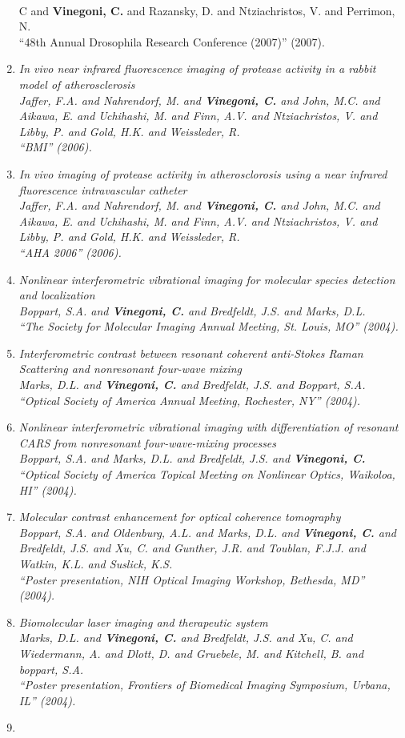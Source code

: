 \documentclass{resume}
\begin{document}
\begin{category}{~~}
\begin{enumerate}
C and {\bf Vinegoni, C.} and Razansky, D. and Ntziachristos, V. and Perrimon, N. \\ ``48th Annual Drosophila Research Conference (2007)''  (2007). \item \it In vivo near infrared fluorescence imaging of protease activity in a rabbit model of atherosclerosis \\ Jaffer, F.A. and Nahrendorf, M. and {\bf Vinegoni, C.} and John, M.C. and Aikawa, E. and Uchihashi, M. and Finn, A.V. and Ntziachristos, V. and Libby, P. and Gold, H.K. and Weissleder, R. \\ ``BMI''  (2006). \item \it In vivo imaging of protease activity in atherosclorosis using a near infrared fluorescence intravascular catheter \\ Jaffer, F.A. and Nahrendorf, M. and {\bf Vinegoni, C.} and John, M.C. and Aikawa, E. and Uchihashi, M. and Finn, A.V. and Ntziachristos, V. and Libby, P. and Gold, H.K. and Weissleder, R. \\ ``AHA 2006''  (2006). \item \it Nonlinear interferometric vibrational imaging for molecular species detection and localization \\ Boppart, S.A. and {\bf Vinegoni, C.} and Bredfeldt, J.S. and Marks, D.L. \\ ``The Society for Molecular Imaging Annual Meeting, St. Louis, MO''  (2004). \item \it Interferometric contrast between resonant coherent anti-Stokes Raman Scattering and nonresonant four-wave mixing \\ Marks, D.L. and {\bf Vinegoni, C.} and Bredfeldt, J.S. and Boppart, S.A. \\ ``Optical Society of America Annual Meeting, Rochester, NY''  (2004). \item \it Nonlinear interferometric vibrational imaging with differentiation of resonant CARS from nonresonant four-wave-mixing processes \\ Boppart, S.A. and Marks, D.L. and Bredfeldt, J.S. and {\bf Vinegoni, C.} \\ ``Optical Society of America Topical Meeting on Nonlinear Optics, Waikoloa, HI''  (2004). \item \it Molecular contrast enhancement for optical coherence tomography \\ Boppart, S.A. and Oldenburg, A.L. and Marks, D.L. and {\bf Vinegoni, C.} and Bredfeldt, J.S. and Xu, C. and Gunther, J.R. and Toublan, F.J.J. and Watkin, K.L. and Suslick, K.S. \\ ``Poster presentation, NIH Optical Imaging Workshop, Bethesda, MD''  (2004). \item \it Biomolecular laser imaging and therapeutic system \\ Marks, D.L. and {\bf Vinegoni, C.} and Bredfeldt, J.S. and Xu, C. and Wiedermann, A. and Dlott, D. and Gruebele, M. and Kitchell, B. and boppart, S.A. \\ ``Poster presentation, Frontiers of Biomedical Imaging Symposium, Urbana, IL''  (2004). \item \it 
\end{enumerate}
\end{category}
\end{document}
